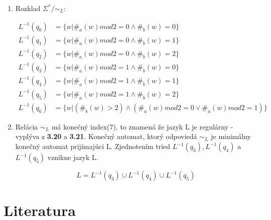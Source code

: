 \documentclass[11pt,a4paper]{article}
\begin{document}
\begin{enumerate}
    \item Rozklad $\Sigma^* / \sim_L$:

    \begin{equation*}
    \begin{aligned}
        L^{-1}(q_0) &= \{w |   \#_a(w) mod 2 = 0 \land \#_b(w) = 0 \} \\
        L^{-1}(q_1) &= \{w |   \#_a(w) mod 2 = 0 \land \#_b(w) = 1 \} \\
        L^{-1}(q_2) &= \{w |   \#_a(w) mod 2 = 0 \land \#_b(w) = 2 \} \\
        L^{-1}(q_3) &= \{w |   \#_a(w) mod 2 = 1 \land \#_b(w) = 0 \} \\
        L^{-1}(q_4) &= \{w |   \#_a(w) mod 2 = 1 \land \#_b(w) = 1 \} \\
        L^{-1}(q_5) &= \{w |   \#_a(w) mod 2 = 1 \land \#_b(w) = 2 \} \\
        L^{-1}(q_6) &= \{w | ( \#_b(w) > 2) \land (\#_a(w) mod 2 = 0 \lor  \#_a(w) mod 2 = 1 ) \}
    \end{aligned}
    \end{equation*}


\item Relácia $\sim_L$ má konečný index(7), to znamená že jazyk L je regulárny - vyplýva z \textbf{3.20} a \textbf{3.21}. Konečný automat, ktorý odpoviedá $\sim_L$ je minimálny konečný automat prijímajúci L.  Zjednotením tried $L^{-1}(q_3), L^{-1}(q_4)$ a $L^{-1}(q_5)$ vznikne jazyk L.

    \begin{equation}
        L = L^{-1}(q_3) \cup L^{-1}(q_4) \cup L^{-1}(q_5) 
    \end{equation}




\end{enumerate}































\newpage
\section{Literatura}

\begin{flushleft}
    
    \end{flushleft}
\end{document}

